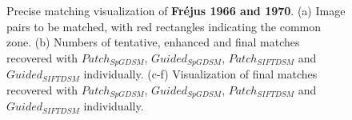 \begin{figure}[htbp]
\begin{center}
{\begin{minipage}[t]{0.48\linewidth}
			\end{minipage}%
		}
		\caption{Precise matching visualization of \textbf{Fr{\'e}jus 1966 and 1970}. (a) Image pairs to be matched, with red rectangles indicating the common zone. (b) Numbers of tentative, enhanced and final matches recovered with $Patch_{SpGDSM}$, $Guided_{SpGDSM}$, $Patch_{SIFTDSM}$ and $Guided_{SIFTDSM}$ individually. (c-f) Visualization of final matches recovered with $Patch_{SpGDSM}$, $Guided_{SpGDSM}$, $Patch_{SIFTDSM}$ and $Guided_{SIFTDSM}$ individually.}
		\label{MatchVizFrejus1966-1970}
	\end{center}
\end{figure} 



